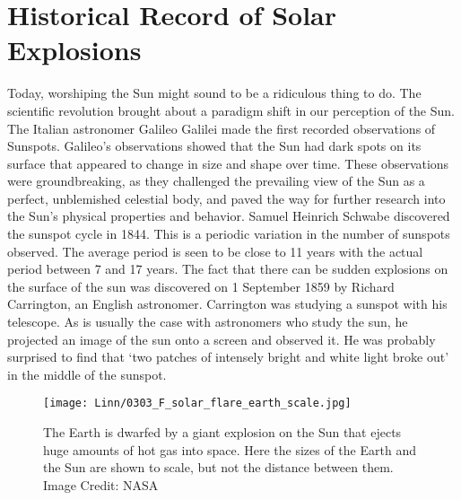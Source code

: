 \documentclass{../template/texnote}
\begin{document}
\section{Historical Record of Solar Explosions}
Today, worshiping the Sun might sound to be a ridiculous thing to do. The scientific revolution brought about a paradigm shift in our perception of the Sun. The Italian astronomer Galileo Galilei made the first recorded observations of Sunspots. 
Galileo's observations showed that the Sun had dark spots on its surface that appeared to change in size and shape over time. These observations were groundbreaking, as they challenged the prevailing view of the Sun as a perfect, unblemished celestial body, and paved the way for further research into the Sun's physical properties and behavior. Samuel Heinrich Schwabe discovered the sunspot cycle in 1844. This is a periodic variation in the number of sunspots observed. The average period is seen to be close to 11 years with the actual period between 7 and 17 years.
The fact that there can be sudden explosions on the surface of the sun was discovered on 1 September 1859 by Richard Carrington, an English astronomer. Carrington was studying a sunspot with his telescope. As is usually the case with astronomers who study the sun, he projected an image of the sun onto a screen and observed it. He was probably surprised to find that ‘two patches of intensely bright and white light broke out’ in the middle of the sunspot.

\begin{figure}
    \centering
    \texttt{[image: Linn/0303\_F\_solar\_flare\_earth\_scale.jpg]}
    \caption{The Earth is dwarfed by a giant explosion on the Sun that ejects huge amounts of hot gas into space. Here the sizes of the Earth and the Sun are shown to scale, but not the distance between them. Image Credit: NASA}
    \label{fig:flare_b}
\end{figure}
\end{document}
